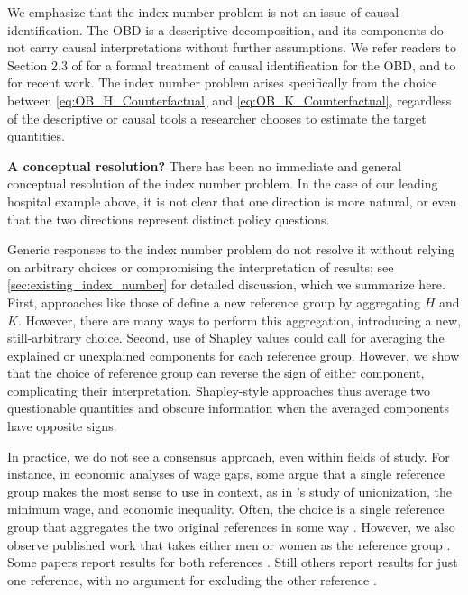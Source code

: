 We emphasize that the index number problem is not an issue of causal identification.
The OBD is a descriptive decomposition, and its components do not carry causal interpretations without further assumptions.
We refer readers to Section 2.3 of \citet{fortinLemieuxFirpo2011} for a formal treatment of causal identification for the OBD, and to \citet{quintas2024multiply,flachaire2025decomposing} for recent work.
The index number problem arises specifically from the choice between \cref{eq:OB_H_Counterfactual} and \cref{eq:OB_K_Counterfactual}, regardless of the descriptive or causal tools a researcher chooses to estimate the target quantities.    

\textbf{A conceptual resolution?}
There has been no immediate and general conceptual resolution of the index number problem.
In the case of our leading hospital example above, it is not clear that one direction is more natural, or even that the two directions represent distinct policy questions.

Generic responses to the index number problem do not resolve it without relying on arbitrary choices or compromising the interpretation of results; see \cref{sec:existing_index_number} for detailed discussion, which we summarize here.
First, approaches like those of \citet{oaxacaRansom1998,neumark1988} define a new reference group by aggregating $H$ and $K$. However, there are many ways to perform this aggregation, introducing a new, still-arbitrary choice.
Second, use of Shapley values \citep{Shapley1953} could call for averaging the explained or unexplained components for each reference group.
However, we show that the choice of reference group can reverse the sign of either component, complicating their interpretation. 
Shapley-style approaches thus average two questionable quantities and obscure information when the averaged components have opposite signs.

In practice, we do not see a consensus approach, even within fields of study.
For instance, in economic analyses of wage gaps, some argue that a single reference group makes the most sense to use in context, as in \citet{dinardoFortinLemieux1996}'s study of unionization, the minimum wage, and economic inequality.
Often, the choice is a single reference group that aggregates the two original references in some way \citep{oaxacaRansom1994,reimers1983,cotton1988,kassenboehmer2014distributional,sharafRashad2016,rahimiNazari2021,Allen2022,bachan2022genderchancellor}.
However, we also observe published work that takes either men or women as the reference group \citep{nielsen2000wage,piazzalunga2019increase,leythienne2021paygapeu,tao2024gender,paradaContzen2025}.
Some papers report results for both references \citep{ONeill2006,fortinLemieuxFirpo2011,sharafRashad2016,rahimiNazari2021}. 
Still others report results for just one reference, with no argument for excluding the other reference \citep{zhang_2019, ayubiShahbaziKhazaei2024,paradaContzen2025,singleton2016,lamJamiesonMittinty2021,leythienne2021paygapeu,alHanawiNjagi2022,tao2024gender}.

